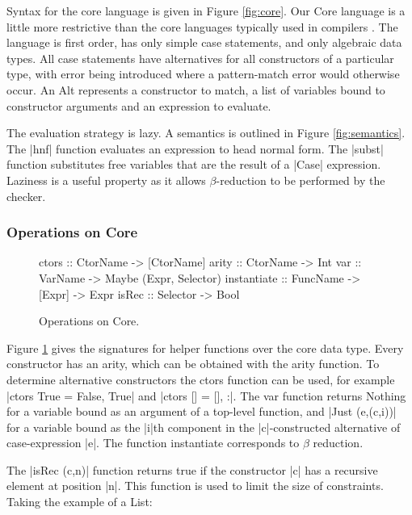 \documentclass[preprint]{sigplanconf}
\newcommand{\C}[1]{\textsf{#1}}
\begin{document}
Syntax for the core language is given in Figure \ref{fig:core}. Our Core language is a little more restrictive than the core languages typically used in compilers \citep{ghc_core}. The language is first order, has only simple case statements, and only algebraic data types. All case statements have alternatives for all constructors of a particular type, with error being introduced where a pattern-match error would otherwise occur. An \C{Alt} represents a constructor to match, a list of variables bound to constructor arguments and an expression to evaluate.

The evaluation strategy is lazy. A semantics is outlined in Figure \ref{fig:semantics}. The |hnf| function evaluates an expression to head normal form. The |subst| function substitutes free variables that are the result of a |Case| expression. Laziness is a useful property as it allows $\beta$-reduction to be performed by the checker.

\subsubsection{Operations on Core}

\begin{figure}
\begin{code}
ctors        :: CtorName  -> [CtorName]
arity        :: CtorName  -> Int
var          :: VarName   -> Maybe (Expr, Selector)
instantiate  :: FuncName  -> [Expr] -> Expr
isRec        :: Selector  -> Bool
\end{code}
\caption{Operations on Core.}
\label{fig:core_operations}
\end{figure}

Figure \ref{fig:core_operations} gives the signatures for helper functions over the core data type. Every constructor has an arity, which can be obtained with the \C{arity} function. To determine alternative constructors the \C{ctors} function can be used, for example |ctors True = {False, True}| and |ctors [] = {[], :}|. The \C{var} function returns \C{Nothing} for a variable bound as an argument of a top-level function, and |Just (e,(c,i))| for a variable bound as the |i|th component in the |c|-constructed alternative of case-expression |e|. The function \C{instantiate} corresponds to $\beta$ reduction.

The |isRec (c,n)| function returns true if the constructor |c| has a recursive element at position |n|. This function is used to limit the size of constraints. Taking the example of a \C{List}:
\end{document}
